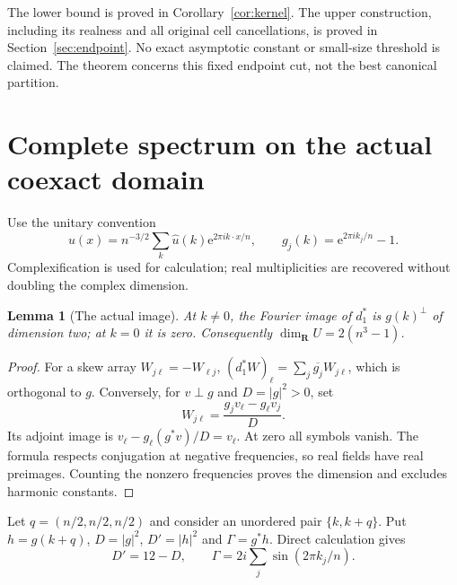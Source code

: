 \documentclass[11pt]{article}
\newcommand{\R}{\mathbf R}
\newcommand{\e}{\mathrm e}
\newtheorem{lemma}[theorem]{Lemma}
\theoremstyle{definition}
\theoremstyle{remark}
\begin{document}
The lower bound is proved in Corollary~\ref{cor:kernel}. The upper
construction, including its realness and all original cell cancellations,
is proved in Section~\ref{sec:endpoint}. No exact asymptotic constant or
small-size threshold is claimed. The theorem concerns this fixed endpoint
cut, not the best canonical partition.
\section{Complete spectrum on the actual coexact domain}\label{sec:spectrum}
Use the unitary convention
\[
 u(x)=n^{-3/2}\sum_k\widehat u(k)\e^{2\pi i k\cdot x/n},\qquad
 g_j(k)=\e^{2\pi i k_j/n}-1.
\]
Complexification is used for calculation; real multiplicities are recovered
without doubling the complex dimension.

\begin{lemma}[The actual image]\label{lem:image}
At $k\ne0$, the Fourier image of $d_1^*$ is $g(k)^\perp$ of dimension two;
at $k=0$ it is zero. Consequently $\dim_\R U=2(n^3-1)$.
\end{lemma}
\begin{proof}
For a skew array $W_{j\ell}=-W_{\ell j}$,
$(d_1^*W)_\ell=\sum_j\overline{g_j}W_{j\ell}$, which is orthogonal to
$g$. Conversely, for $v\perp g$ and $D=|g|^2>0$, set
\[
              W_{j\ell}=\frac{g_jv_\ell-g_\ell v_j}{D}.
\]
Its adjoint image is $v_\ell-g_\ell(g^*v)/D=v_\ell$. At zero all symbols
vanish. The formula respects conjugation at negative frequencies, so real
fields have real preimages. Counting the nonzero frequencies proves the
dimension and excludes harmonic constants.
\end{proof}

Let $q=(n/2,n/2,n/2)$ and consider an unordered pair $\{k,k+q\}$. Put
$h=g(k+q)$, $D=|g|^2$, $D'=|h|^2$ and $\Gamma=g^*h$. Direct calculation gives
\begin{equation}\label{eq:symbols}
 D'=12-D,\qquad \Gamma=2i\sum_j\sin(2\pi k_j/n).
\end{equation}
\end{document}
